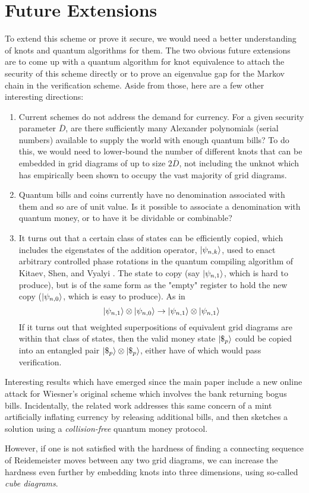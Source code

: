 \section{Future Extensions}

To extend this scheme or prove it secure, we would need a better
understanding of knots and quantum algorithms for them. The
two obvious future extensions are to come up with a quantum algorithm
for knot equivalence to attach the security of this scheme directly or
to prove an eigenvalue gap for the Markov chain in the verification
scheme. Aside from those, here are a
few other interesting directions:

\begin{enumerate}
\item Current schemes do not address the demand for currency.
For a given security parameter $\overline{D}$, 
are there sufficiently many Alexander polynomials (serial numbers)
available to supply the world with enough quantum bills?
To do this, we would need to lower-bound the number of
different knots that can be embedded in grid diagrams of up to size
$2\overline{D}$, not including the unknot which has empirically been shown
to
occupy the vast majority of grid diagrams.
\item
Quantum bills and coins currently have no denomination associated with
them and so are of unit value.
Is it possible to associate a denomination with quantum money, or to have
it be dividable or combinable?
\item 
It turns out that a certain class of states can be efficiently copied, which
includes the eigenstates of the addition operator, $|\psi_{n,k} \rangle$,
used to enact arbitrary controlled phase
rotations in the quantum compiling algorithm of Kitaev, Shen, and Vyalyi
\cite{KSV02}. The state to copy (say $|\psi_{n,1} \rangle$, which is hard
to produce), but is of the
same form as the "empty" register to hold the new copy
($|\psi_{n,0} \rangle$, which
is easy to produce). As in
\begin{displaymath}
|\psi_{n,1} \rangle\otimes|\psi_{n,0} \rangle \rightarrow
|\psi_{n,1} \rangle\otimes|\psi_{n,1} \rangle
\end{displaymath}
If it turns out that weighted superpositions of equivalent
grid diagrams are within that class of states, then the valid money state
$|\$_p \rangle$ could be copied into an entangled pair
$|\$_p \rangle \otimes |\$_p \rangle$, either have of which would pass
verification.
\end{enumerate}

Interesting results which have emerged since the main paper \cite{Farhi2010}
include a new online attack for Wiesner's original scheme
\cite{Lutomirski2010} which involves the bank returning bogus bills.
Incidentally, the related work \cite{Lutomirski 2010} addresses this same
concern of a mint artificially inflating currency by releasing additional bills,
and then sketches a solution using a \emph{collision-free} quantum money
protocol.

However, if one is not satisfied with the hardness of finding a connecting
sequence of Reidemeister moves between any two grid diagrams, we can increase
the hardness even further by embedding knots into three dimensions, using
so-called \emph{cube diagrams}\cite{Baldridge2009}.
